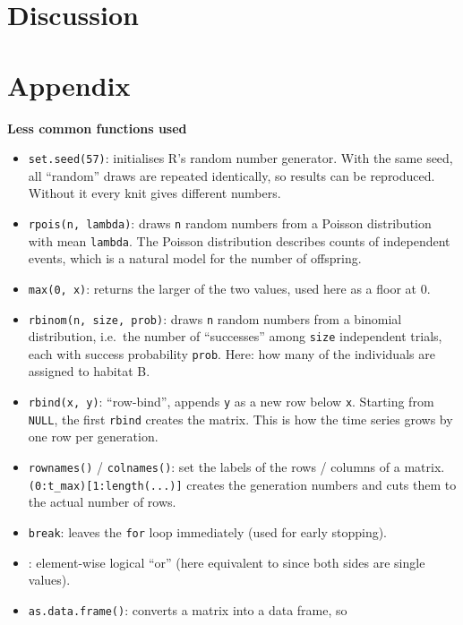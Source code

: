 \documentclass[
]{article}
\providecommand{\tightlist}{%
  \setlength{\itemsep}{0pt}\setlength{\parskip}{0pt}}
\begin{document}
\section{Discussion}\label{discussion}

\section*{Appendix}\label{appendix}

\textbf{Less common functions used}

\begin{itemize}
\tightlist
\item
  \texttt{set.seed(57)}: initialises R's random number generator. With
  the same seed, all ``random'' draws are repeated identically, so
  results can be reproduced. Without it every knit gives different
  numbers.
\item
  \texttt{rpois(n,\ lambda)}: draws \texttt{n} random numbers from a
  Poisson distribution with mean \texttt{lambda}. The Poisson
  distribution describes counts of independent events, which is a
  natural model for the number of offspring.
\item
  \texttt{max(0,\ x)}: returns the larger of the two values, used here
  as a floor at 0.
\item
  \texttt{rbinom(n,\ size,\ prob)}: draws \texttt{n} random numbers from
  a binomial distribution, i.e.~the number of ``successes'' among
  \texttt{size} independent trials, each with success probability
  \texttt{prob}. Here: how many of the individuals are assigned to
  habitat B.
\item
  \texttt{rbind(x,\ y)}: ``row-bind'', appends \texttt{y} as a new row
  below \texttt{x}. Starting from \texttt{NULL}, the first
  \texttt{rbind} creates the matrix. This is how the time series grows
  by one row per generation.
\item
  \texttt{rownames()} / \texttt{colnames()}: set the labels of the rows
  / columns of a matrix. \texttt{(0:t\_max){[}1:length(...){]}} creates
  the generation numbers and cuts them to the actual number of rows.
\item
  \texttt{break}: leaves the \texttt{for} loop immediately (used for
  early stopping).
\item
  \texttt{\textbar{}}: element-wise logical ``or'' (here equivalent to
  \texttt{\textbar{}\textbar{}} since both sides are single values).
\item
  \texttt{as.data.frame()}: converts a matrix into a data frame, so

\end{itemize}
\end{document}
